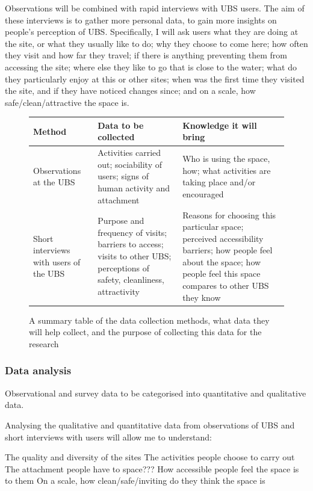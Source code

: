 \documentclass{article}
\begin{document}
Observations will be combined with rapid interviews with UBS users. The aim of these interviews is to gather more personal data, to gain more insights on people’s perception of UBS. Specifically, I will ask users what they are doing at the site, or what they usually like to do; why they choose to come here; how often they visit and how far they travel; if there is anything preventing them from accessing the site; where else they like to go that is close to the water; what do they particularly enjoy at this or other sites; when was the first time they visited the site, and if they have noticed changes since; and on a scale, how safe/clean/attractive the space is.

\begin{figure}[htp]
\begin{tabularx}{\textwidth} { 
  | >{\raggedright\arraybackslash}X 
  | >{\raggedright\arraybackslash}X 
  | >{\raggedright\arraybackslash}X | }
  \hline
  Method & Data to be collected & Knowledge it will bring \\ 
     \hline
  Observations at the UBS
  & Activities carried out; sociability of users; signs of human activity and attachment
  &  Who is using the space, how; what activities are taking place and/or encouraged \\ 
  	\hline
  Short interviews with users of the UBS
  & Purpose and frequency of visits; barriers to access; visits to other UBS; perceptions of safety, cleanliness, attractivity
  & Reasons for choosing this particular space; perceived accessibility barriers; how people feel about the space; how people feel this space compares to other UBS they know \\ 
  \hline
\end{tabularx}
\caption{A summary table of the data collection methods, what data they will help collect, and the purpose of collecting this data for the research}
\end{figure}

\subsubsection{Data analysis}

Observational and survey data to be categorised into quantitative and qualitative data.

Analysing the qualitative and quantitative data from observations of UBS and short interviews with users will allow me to understand:

\begin{outline}
	\1 The quality and diversity of the sites
	\1 The activities people choose to carry out
	\1 The attachment people have to space??? 
	\1 How accessible people feel the space is to them
	\1 On a scale, how clean/safe/inviting do they think the space is
\end{outline}
\end{document}
